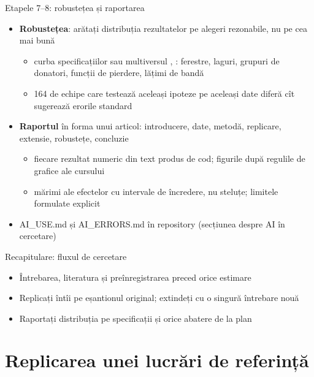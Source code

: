 \begin{frame}{Etapele 7--8: robustețea și raportarea}
\itemsize{\small}
\begin{itemize}
    \item \textbf{Robustețea}: arătați distribuția rezultatelor pe alegeri rezonabile, nu pe cea mai bună
    \begin{itemize}
        \item curba specificațiilor sau multiversul , : ferestre, laguri, grupuri de donatori, funcții de pierdere, lățimi de bandă
        \item 164 de echipe care testează aceleași ipoteze pe aceleași date diferă cît sugerează erorile standard 
    \end{itemize}
    \item \textbf{Raportul} în forma unui articol: introducere, date, metodă, replicare, extensie, robustețe, concluzie
    \begin{itemize}
        \item fiecare rezultat numeric din text produs de cod; figurile după regulile de grafice ale cursului
        \item mărimi ale efectelor cu intervale de încredere, nu steluțe; limitele formulate explicit
    \end{itemize}
    \item AI\_USE.md și AI\_ERRORS.md în repository (secțiunea despre AI în cercetare)
\end{itemize}
\end{frame}

\begin{frame}{Recapitulare: fluxul de cercetare}
\itemsize{\small}
\begin{itemize}
    \item Întrebarea, literatura și preînregistrarea preced orice estimare
    \item Replicați întîi pe eșantionul original; extindeți cu o singură întrebare nouă
    \item Raportați distribuția pe specificații și orice abatere de la plan
\end{itemize}
\end{frame}


\section{Replicarea unei lucrări de referință}

